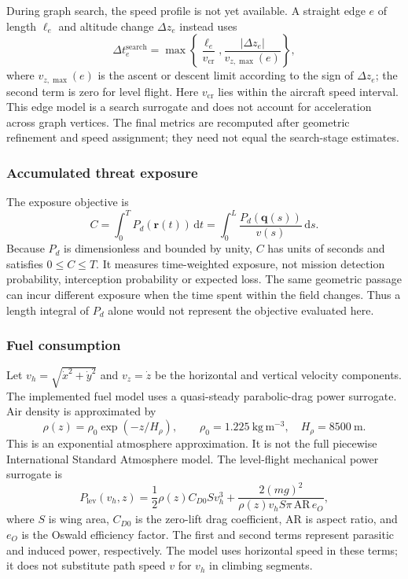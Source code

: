 \documentclass[preprint,12pt]{elsarticle}
\begin{document}
During graph search, the speed profile is not yet available. A straight
edge $e$ of length $\ell_e$ and altitude change $\Delta z_e$ instead uses
\begin{equation}
 \Delta t_e^{\mathrm{search}}=
 \max\left\{\frac{\ell_e}{v_{\mathrm{cr}}},
             \frac{|\Delta z_e|}{v_{z,\max}(e)}\right\},
 \label{pr:eq:searchtime}
\end{equation}
where $v_{z,\max}(e)$ is the ascent or descent limit according to the sign
of $\Delta z_e$; the second term is zero for level flight. Here
$v_{\mathrm{cr}}$ lies within the aircraft speed interval. This edge model
is a search surrogate and does not account for acceleration across graph
vertices. The final metrics are recomputed after geometric refinement and
speed assignment; they need not equal the search-stage estimates.

\subsubsection{Accumulated threat exposure}
The exposure objective is
\begin{equation}
 C=\int_0^T P_d(\mathbf{r}(t))\,\mathrm{d}t
   =\int_0^L\frac{P_d(\mathbf{q}(s))}{v(s)}\,\mathrm{d}s.
 \label{pr:eq:exposure}
\end{equation}
Because $P_d$ is dimensionless and bounded by unity, $C$ has units of
seconds and satisfies $0\le C\le T$. It measures time-weighted exposure,
not mission detection probability, interception probability or expected
loss. The same geometric passage can incur different exposure when the
time spent within the field changes. Thus a length integral of $P_d$ alone
would not represent the objective evaluated here.

\subsubsection{Fuel consumption}
Let $v_h=\sqrt{\dot x^2+\dot y^2}$ and $v_z=\dot z$ be the horizontal and
vertical velocity components. The implemented fuel model uses a
quasi-steady parabolic-drag power surrogate. Air density is approximated by
\begin{equation}
 \rho(z)=\rho_0\exp(-z/H_\rho),\qquad
 \rho_0=1.225~\mathrm{kg\,m^{-3}},\quad H_\rho=8500~\mathrm{m}.
 \label{pr:eq:density}
\end{equation}
This is an exponential atmosphere approximation. It is not the full
piecewise International Standard Atmosphere model. The level-flight
mechanical power surrogate is
\begin{equation}
 P_{\mathrm{lev}}(v_h,z)=
 \frac{1}{2}\rho(z)C_{D0}S v_h^3+
 \frac{2(mg)^2}{\rho(z)v_h S\pi\,\mathrm{AR}\,e_O},
 \label{pr:eq:levelpower}
\end{equation}
where $S$ is wing area, $C_{D0}$ is the zero-lift drag coefficient,
$\mathrm{AR}$ is aspect ratio, and $e_O$ is the Oswald efficiency factor.
The first and second terms represent parasitic and induced power,
respectively. The model uses horizontal speed in these terms; it does not
substitute path speed $v$ for $v_h$ in climbing segments.
\end{document}
